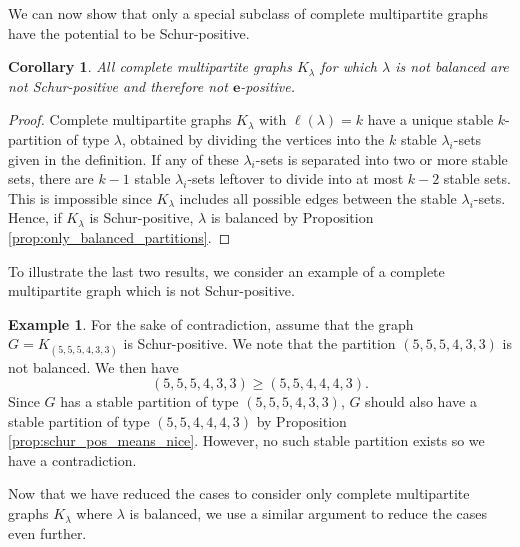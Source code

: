 \documentclass[12pt]{amsart}
\numberwithin{equation}{section}
\theoremstyle{plain}
\newtheorem{corollary}[equation]{Corollary}
\theoremstyle{definition}
\newtheorem{example}[equation]{Example}
\theoremstyle{remark}
\begin{document}
We can now show that only a special subclass of complete multipartite graphs have the potential to be Schur-positive.

\begin{corollary}
\label{cor:only_balanced_comp_graphs}
All complete multipartite graphs $K_{\lambda}$ for which $\lambda$ is not balanced are not Schur-positive and therefore not $\mathbf{e}$-positive. 
\end{corollary}
\begin{proof}
Complete multipartite graphs $K_{\lambda}$ with $\ell (\lambda)=k$ have a unique stable $k$-partition of type $\lambda$, obtained by dividing the vertices into the $k$ stable $\lambda_i$-sets given in the definition. If any of these $\lambda_i$-sets is separated into two or more stable sets, there are $k-1$ stable $\lambda_i$-sets leftover to divide into at most $k-2$ stable sets. This is impossible since $K_{\lambda}$ includes  all possible edges between the stable $\lambda_i$-sets. Hence, if $K_{\lambda}$ is Schur-positive, $\lambda$ is balanced by Proposition \ref{prop:only_balanced_partitions}. 
\end{proof}

To illustrate the last two results, we consider an example of a complete multipartite graph which is not Schur-positive.

\begin{example}
For the sake of contradiction, assume that the graph $G=K_{(5,5,5,4,3,3)}$ is Schur-positive. We note that the partition $(5,5,5,4,3,3)$ is not balanced. We then have
\[
(5,5,5,4,3,3)\ge (5,5,4,4,4,3).
\]
Since $G$ has a stable partition of type $(5,5,5,4,3,3)$, $G$ should also have a stable partition of type $(5,5,4,4,4,3)$ by Proposition \ref{prop:schur_pos_means_nice}. However, no such stable partition exists so we have a contradiction.
\end{example}



Now that we have reduced the cases to consider only complete multipartite graphs $K_{\lambda}$ where $\lambda$ is balanced, we use a similar argument to reduce the cases even further. 
\end{document}
